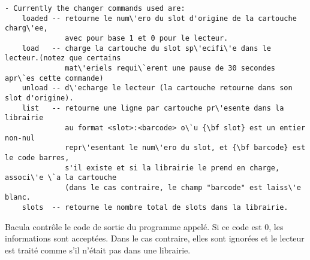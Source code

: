 \footnotesize
\begin{verbatim}
- Currently the changer commands used are:
    loaded -- retourne le num\'ero du slot d'origine de la cartouche charg\'ee, 
              avec pour base 1 et 0 pour le lecteur.
    load   -- charge la cartouche du slot sp\'ecifi\'e dans le lecteur.(notez que certains 
              mat\'eriels requi\`erent une pause de 30 secondes apr\`es cette commande)
    unload -- d\'echarge le lecteur (la cartouche retourne dans son slot d'origine).
    list   -- retourne une ligne par cartouche pr\'esente dans la librairie 
              au format <slot>:<barcode> o\`u {\bf slot} est un entier non-nul 
              repr\'esentant le num\'ero du slot, et {\bf barcode} est le code barres, 
              s'il existe et si la librairie le prend en charge, associ\'e \`a la cartouche 
              (dans le cas contraire, le champ "barcode" est laiss\'e blanc.
    slots  -- retourne le nombre total de slots dans la librairie.
\end{verbatim}
\normalsize

Bacula contr\^ole le code de sortie du programme appel\'e. Si ce code est 0, les 
informations sont accept\'ees. Dans le cas contraire, elles sont ignor\'ees 
et le lecteur est trait\'e comme s'il n'\'etait pas dans une librairie.
